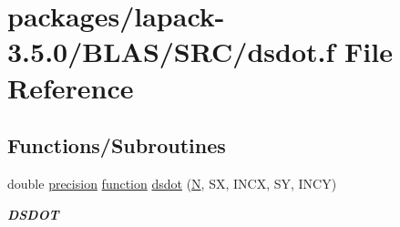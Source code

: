 \hypertarget{lapack-3_85_80_2BLAS_2SRC_2dsdot_8f}{}\section{packages/lapack-\/3.5.0/\+B\+L\+A\+S/\+S\+R\+C/dsdot.f File Reference}
\label{lapack-3_85_80_2BLAS_2SRC_2dsdot_8f}
\subsection*{Functions/\+Subroutines}
\begin{DoxyCompactItemize}
\item 
double \hyperlink{numinquire_8h_a2c8e616467665d0b2814d4c1589ba74e}{precision} \hyperlink{afunc_8m_a7b5e596df91eadea6c537c0825e894a7}{function} \hyperlink{group__double__blas__level1_ga32d6fccb43cb13feafc23825f2685ba0}{dsdot} (\hyperlink{polmisc_8c_a0240ac851181b84ac374872dc5434ee4}{N}, S\+X, I\+N\+C\+X, S\+Y, I\+N\+C\+Y)
\begin{DoxyCompactList}\small\item\em {\bfseries D\+S\+D\+O\+T} \end{DoxyCompactList}\end{DoxyCompactItemize}

